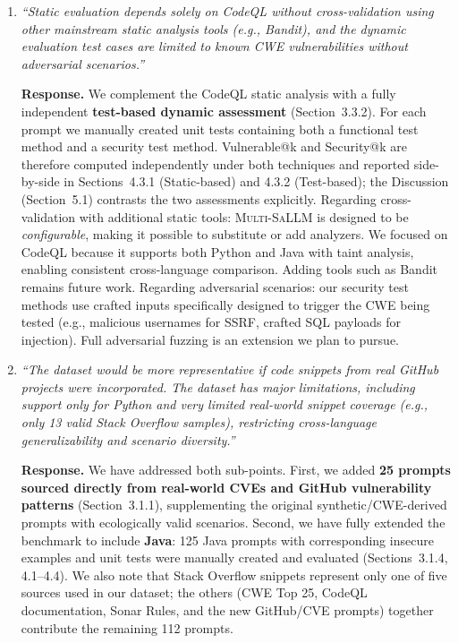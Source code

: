 \documentclass[12pt]{article}
\newcommand{\sandoval}{\textsc{Multi-SaLLM}}
\begin{document}
\begin{enumerate}[leftmargin=*, label=\textbf{R2.\arabic*.}]

\item \textit{``Static evaluation depends solely on CodeQL without cross-validation
using other mainstream static analysis tools (e.g., Bandit), and the dynamic evaluation
test cases are limited to known CWE vulnerabilities without adversarial scenarios.''}

\textbf{Response.}
We complement the CodeQL static analysis with a fully independent
\textbf{test-based dynamic assessment} (Section~3.3.2). For each prompt we manually
created unit tests containing both a functional test method and a security test
method. Vulnerable@k and Security@k are therefore computed independently under both
techniques and reported side-by-side in Sections~4.3.1 (Static-based) and 4.3.2
(Test-based); the Discussion (Section~5.1) contrasts the two assessments explicitly.
Regarding cross-validation with additional static tools: \sandoval{} is designed to
be \textit{configurable}, making it possible to substitute or add analyzers. We
focused on CodeQL because it supports both Python and Java with taint analysis,
enabling consistent cross-language comparison. Adding tools such as Bandit remains
future work. Regarding adversarial scenarios: our security test methods use crafted
inputs specifically designed to trigger the CWE being tested (e.g., malicious
usernames for SSRF, crafted SQL payloads for injection). Full adversarial fuzzing
is an extension we plan to pursue.

\item \textit{``The dataset would be more representative if code snippets from real
GitHub projects were incorporated. The dataset has major limitations, including support
only for Python and very limited real-world snippet coverage (e.g., only 13 valid Stack
Overflow samples), restricting cross-language generalizability and scenario diversity.''}

\textbf{Response.}
We have addressed both sub-points. First, we added \textbf{25 prompts sourced
directly from real-world CVEs and GitHub vulnerability patterns}
(Section~3.1.1), supplementing the original synthetic/CWE-derived prompts with
ecologically valid scenarios. Second, we have fully extended the benchmark to
include \textbf{Java}: 125 Java prompts with corresponding insecure examples and
unit tests were manually created and evaluated (Sections~3.1.4, 4.1--4.4). We
also note that Stack Overflow snippets represent only one of five sources used in
our dataset; the others (CWE Top 25, CodeQL documentation, Sonar Rules, and the
new GitHub/CVE prompts) together contribute the remaining 112 prompts.


\end{enumerate}
\end{document}
